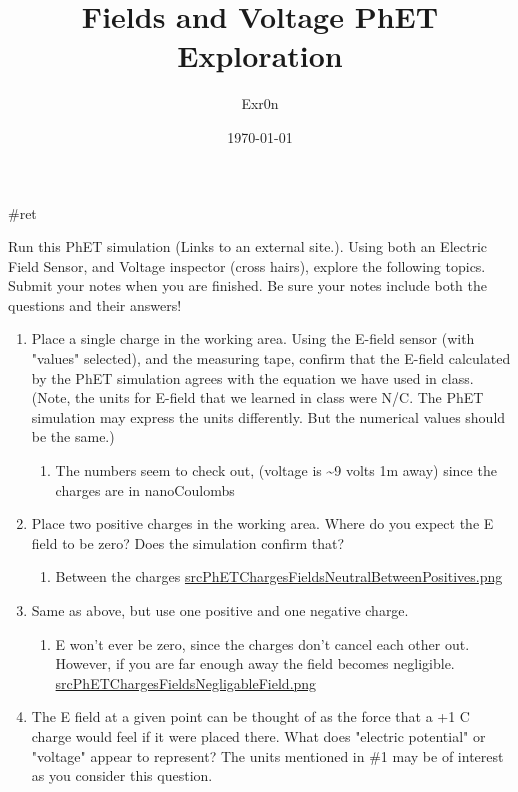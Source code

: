 \documentclass[letterpaper]{article}
\author{Exr0n}
\date{\today}
\title{Fields and Voltage PhET Exploration}
\renewcommand{\tableofcontents}{}
\begin{document}
\tableofcontents

\#ret

Run this PhET simulation (Links to an external site.). Using both an
Electric Field Sensor, and Voltage inspector (cross hairs), explore the
following topics. Submit your notes when you are finished. Be sure your
notes include both the questions and their answers!

\begin{enumerate}
\item Place a single charge in the working area. Using the E-field sensor
(with "values" selected), and the measuring tape, confirm that the
E-field calculated by the PhET simulation agrees with the equation we
have used in class. (Note, the units for E-field that we learned in
class were N/C. The PhET simulation may express the units
differently. But the numerical values should be the same.)

\begin{enumerate}
\item The numbers seem to check out, (voltage is \textasciitilde{}9 volts 1m away) since
the charges are in nanoCoulombs
\end{enumerate}

\item Place two positive charges in the working area. Where do you expect
the E field to be zero? Does the simulation confirm that?

\begin{enumerate}
\item Between the charges
\href{srcPhETChargesFieldsNeutralBetweenPositives.png.org}{srcPhETChargesFieldsNeutralBetweenPositives.png}
\end{enumerate}

\item Same as above, but use one positive and one negative charge.

\begin{enumerate}
\item E won't ever be zero, since the charges don't cancel each other
out. However, if you are far enough away the field becomes
negligible.
\href{srcPhETChargesFieldsNegligableField.png.org}{srcPhETChargesFieldsNegligableField.png}
\end{enumerate}

\item The E field at a given point can be thought of as the force that a +1
C charge would feel if it were placed there. What does "electric
potential" or "voltage" appear to represent? The units mentioned in
\#1 may be of interest as you consider this question.


\end{enumerate}
\end{document}
